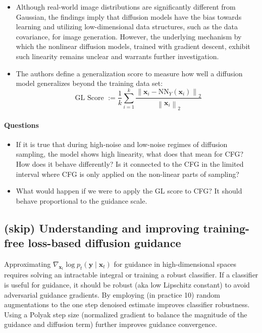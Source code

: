 \documentclass{article}
\begin{document}
\begin{itemize}
    \item Although real-world image distributions are significantly different from Gaussian, the findings imply that diffusion models have the bias towards learning and utilizing low-dimensional data structures, such as the data covariance, for image generation. However, the underlying mechanism by which the nonlinear diffusion models, trained with gradient descent, exhibit such linearity remains unclear and warrants further investigation.
    \item The authors define a generalization score to measure how well a diffusion model generalizes beyond the training data set:
    $$
    \text { GL Score }:=\frac{1}{k} \sum_{i=1}^k \frac{\left\|\boldsymbol{x}_i-\mathrm{NN}_Y\left(\boldsymbol{x}_i\right)\right\|_2}{\left\|\boldsymbol{x}_i\right\|_2}
    $$
\end{itemize}

\paragraph{Questions}
\begin{itemize}
    \item If it is true that during high-noise and low-noise regimes of diffusion sampling, the model shows high linearity, what does that mean for CFG? How does it behave differently? Is it connected to the CFG in the limited interval where CFG is only applied on the non-linear parts of sampling?
    \item What would happen if we were to apply the GL score to CFG? It should behave proportional to the guidance scale.
\end{itemize}

\subsection{(skip) Understanding and improving training-free loss-based diffusion guidance}
Approximating $\nabla_{\boldsymbol{x}_t} \log p_t\left(\boldsymbol{y} \mid \boldsymbol{x}_t\right)$ for guidance in high-dimensional spaces requires solving an intractable integral or training a robust classifier. If a classifier is useful for guidance, it should be robust (aka low Lipschitz constant) to avoid adversarial guidance gradients. By employing (in practice 10) random augmentations to the one step denoised estimate improves classifier robustness. Using a Polyak step size (normalized gradient to balance the magnitude of the guidance and diffusion term) further improves guidance convergence.
\end{document}
